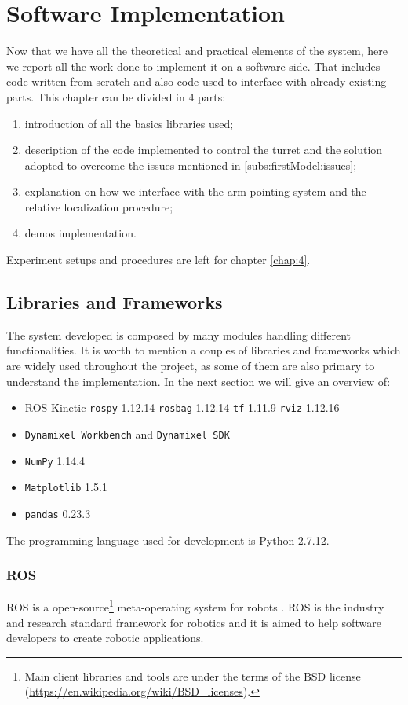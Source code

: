 \chapter{Software Implementation}\label{chap:3}
Now that we have all the theoretical and practical elements of the system, here we report all the work done to implement it on a software side. That includes code written from scratch and also code used to interface with already existing parts. This chapter can be divided in 4 parts:
\begin{enumerate}
    \item introduction of all the basics libraries used;
    \item description of the code implemented to control the turret and the solution adopted to overcome the issues mentioned in \ref{subs:firstModel:issues};
    \item explanation on how we interface with the arm pointing system and the relative localization procedure;
    \item demos implementation.
\end{enumerate}
Experiment setups and procedures are left for chapter \ref{chap:4}.

\section{Libraries and Frameworks}
The system developed is composed by many modules handling different functionalities. It is worth to mention a couples of libraries and frameworks which are widely used throughout the project, as some of them are also primary to understand the implementation. In the next section we will give an overview of:
\begin{itemize}
	\item \ac{ROS} Kinetic
	\subitem \texttt{rospy} 1.12.14
	\subitem \texttt{rosbag} 1.12.14
	\subitem \texttt{tf} 1.11.9
	\subitem \texttt{rviz} 1.12.16
	\item \texttt{Dynamixel Workbench} and \texttt{Dynamixel SDK}
	\item \texttt{NumPy} 1.14.4
	\item \texttt{Matplotlib} 1.5.1
	\item \texttt{pandas} 0.23.3
\end{itemize}
The programming language used for development is Python 2.7.12.\\

\subsection{\acf{ROS}}
\ac{ROS} is a open-source\footnote{Main client libraries and tools are under the terms of the BSD license (\url{https://en.wikipedia.org/wiki/BSD_licenses}).} meta-operating system for robots \cite{ros}. \ac{ROS} is the industry and research standard framework for robotics and it is aimed to help software developers to  create robotic applications.\\

